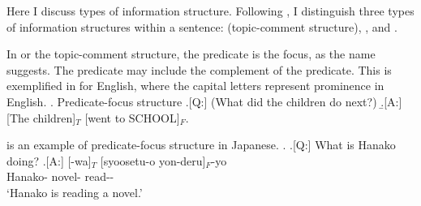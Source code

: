 Here I discuss types of information structure.
Following ,
I distinguish three types of information structures within a sentence:
 (topic-comment structure),
, and
.

In  or the topic-comment structure,
the predicate is the focus, as the name suggests.
The predicate may include the complement of the predicate.
This is exemplified in \Next[A] for English,
where the capital letters represent prominence in English.
\ex. Predicate-focus structure
	\a.[Q:] (What did the children do next?)
	\b.[A:] [The children]$_{T}$ [went to SCHOOL]$_{F}$.
	\hfill{\cite[][p.\ 121]{lambrecht94}}

\Next[A] is an example of predicate-focus structure in Japanese.
%
\ex.
 \a.[Q:] What is Hanako doing?
 \bg.[A:] [-wa]$_{T}$ [syoosetu-o yon-deru]$_{F}$-yo \\
		Hanako- novel- read-- \\
		`Hanako is reading a novel.'

